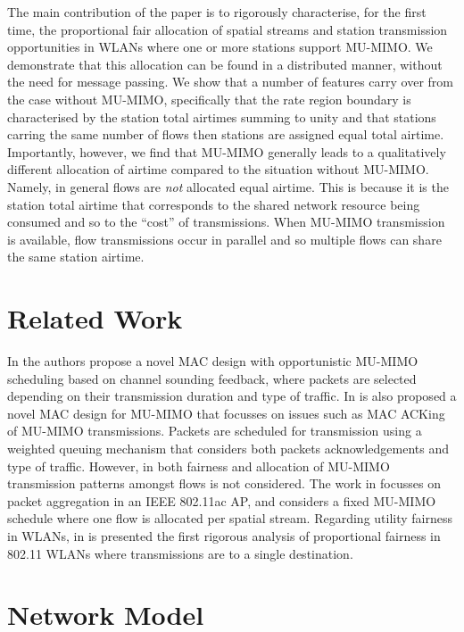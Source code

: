\documentclass[11pt]{amsart}
\begin{document}
The main contribution of the paper is to rigorously characterise, for the first time, the proportional fair allocation of spatial streams and station transmission opportunities in WLANs where one or more stations support MU-MIMO.   We demonstrate that this allocation can be found in a distributed manner, without the need for message passing.   We show that a number of features carry over from the case without MU-MIMO, specifically that the rate region boundary is characterised by the station total airtimes summing to unity and that stations carring the same number of flows then stations are assigned equal total airtime. Importantly, however, we find that MU-MIMO generally leads to a qualitatively different allocation of airtime compared to the situation without MU-MIMO.  Namely, in general flows are \emph{not} allocated equal airtime.   This is because it is the station total airtime that corresponds to the shared network resource being consumed and so to the ``cost'' of transmissions.  When MU-MIMO transmission is available, flow transmissions occur in parallel and so multiple flows can share the same station airtime.

\section{Related Work}
In \cite{cai2008distributed} the authors propose a novel MAC design with opportunistic MU-MIMO scheduling based on channel sounding feedback, where packets are selected depending on their transmission duration and type of traffic. In \cite{5684351} is also proposed a novel MAC design for MU-MIMO that focusses on issues such as MAC ACKing of MU-MIMO transmissions. Packets are scheduled for transmission using a weighted queuing mechanism that considers both packets acknowledgements and type of traffic. However, in both \cite{cai2008distributed} \cite{5684351} fairness and allocation of MU-MIMO transmission patterns amongst flows is not considered. The work in \cite{6287486} focusses on packet aggregation in an IEEE 802.11ac AP, and considers a  fixed MU-MIMO schedule where one flow is allocated per spatial stream. Regarding utility fairness in WLANs, in \cite{5910091} is presented the first rigorous analysis of proportional fairness in 802.11 WLANs where transmissions are to a single destination. 
 
\section{Network Model}
\end{document}
